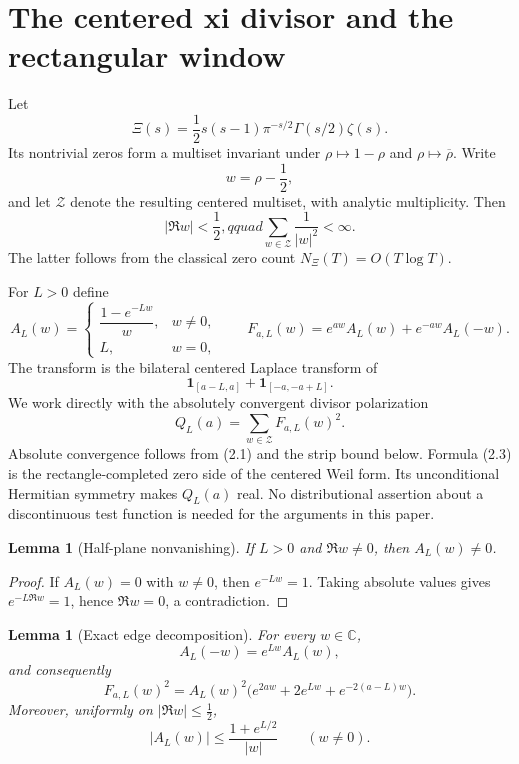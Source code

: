 \documentclass[11pt]{article}
\newtheorem{lemma}[theorem]{Lemma}
\newcommand{\C}{\mathbb C}
\newcommand{\XiR}{\Xi}
\newcommand{\cZ}{\mathcal Z}
\begin{document}
\section{The centered xi divisor and the rectangular window}

Let
\[
  \XiR(s)=\frac12s(s-1)\pi^{-s/2}\Gamma(s/2)\zeta(s).
\]
Its nontrivial zeros form a multiset invariant under $\rho\mapsto1-\rho$ and
$\rho\mapsto\overline\rho$.  Write
\[
  w=\rho-\frac12,
\]
and let $\cZ$ denote the resulting centered multiset, with analytic multiplicity.  Then
\[
  |\Re w|<\frac12,qquad
  \sum_{w\in\cZ}\frac1{|w|^2}<\infty.
  \tag{2.1}
\]
The latter follows from the classical zero count $N_\Xi(T)=O(T\log T)$.

For $L>0$ define
\[
  A_L(w)=
  \begin{cases}
  \dfrac{1-e^{-Lw}}{w},&w\ne0,\\[6pt]
  L,&w=0,
  \end{cases}
  \qquad
  F_{a,L}(w)=e^{aw}A_L(w)+e^{-aw}A_L(-w).
  \tag{2.2}
\]
The transform is the bilateral centered Laplace transform of
\[
  \mathbf 1_{[a-L,a]}+\mathbf 1_{[-a,-a+L]}.
\]
We work directly with the absolutely convergent divisor polarization
\[
  Q_L(a)=\sum_{w\in\cZ}F_{a,L}(w)^2.
  \tag{2.3}
\]
Absolute convergence follows from (2.1) and the strip bound below.  Formula (2.3) is the
rectangle-completed zero side of the centered Weil form.  Its unconditional Hermitian symmetry
makes $Q_L(a)$ real.  No distributional assertion about a
discontinuous test function is needed for the arguments in this paper.

\begin{lemma}[Half-plane nonvanishing]\label{lem:nonvanishing}
If $L>0$ and $\Re w\ne0$, then $A_L(w)\ne0$.
\end{lemma}

\begin{proof}
If $A_L(w)=0$ with $w\ne0$, then $e^{-Lw}=1$.  Taking absolute values gives
$e^{-L\Re w}=1$, hence $\Re w=0$, a contradiction.
\end{proof}

\begin{lemma}[Exact edge decomposition]\label{lem:edge}
For every $w\in\C$,
\[
  A_L(-w)=e^{Lw}A_L(w),
  \tag{2.4}
\]
and consequently
\[
  F_{a,L}(w)^2=A_L(w)^2
  \bigl(e^{2aw}+2e^{Lw}+e^{-2(a-L)w}\bigr).
  \tag{2.5}
\]
Moreover, uniformly on $|\Re w|\le\frac12$,
\[
  |A_L(w)|\le \frac{1+e^{L/2}}{|w|}\qquad(w\ne0).
  \tag{2.6}
\]
\end{lemma}
\end{document}
